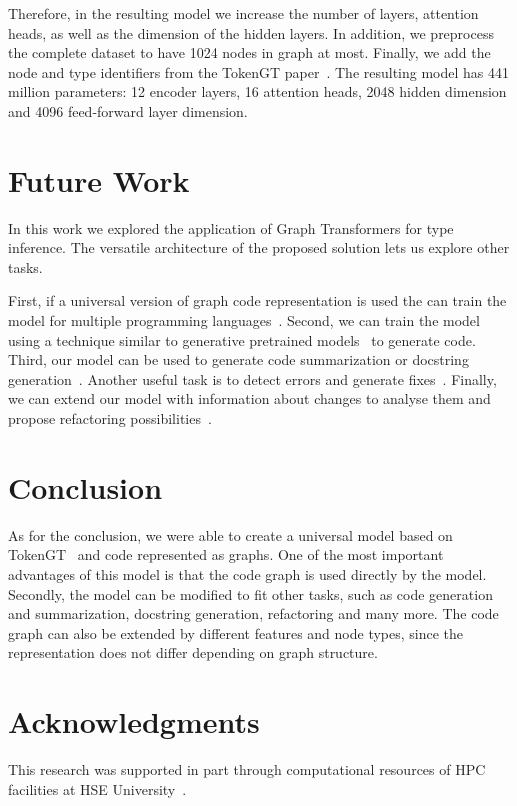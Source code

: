 \documentclass[conference]{IEEEtran}
\begin{document}
Therefore, in the resulting model we increase the number of layers, attention heads, as well as the dimension of the hidden layers.
In addition, we preprocess the complete dataset to have 1024 nodes in graph at most.
Finally, we add the node and type identifiers from the TokenGT paper~\cite{kim_pure_2022}.
The resulting model has 441 million parameters: 12 encoder layers, 16 attention heads, 2048 hidden dimension and 4096 feed-forward layer dimension.

\begin{table*}[t]
    \centering
    \caption{Expirement results of Top-n predictions for different model variants.}
    \label{tab:ablation}
    }
\end{table*}

\section{Future Work}\label{sec:future-work}

In this work we explored the application of Graph Transformers for type inference.
The versatile architecture of the proposed solution lets us explore other tasks.

First, if a universal version of graph code representation is used the can train the model for multiple programming languages~\cite{wang_unified_2022}.
Second, we can train the model using a technique similar to generative pretrained models~\cite{radford_language_2019,brown_language_2020} to generate code.
Third, our model can be used to generate code summarization or docstring generation~\cite{barone_parallel_2017,liu_haconvgnn_2021}.
Another useful task is to detect errors and generate fixes~\cite{bhatia_automated_2016,fujimoto_addressing_2018,marginean_sapfix_2019}.
Finally, we can extend our model with information about changes to analyse them and propose refactoring possibilities~\cite{cabrera_lozoya_commit2vec_2021}.

\section{Conclusion}\label{sec:conclusion}

As for the conclusion, we were able to create a universal model based on TokenGT~\cite{kim_pure_2022} and code represented as graphs.
One of the most important advantages of this model is that the code graph is used directly by the model.
Secondly, the model can be modified to fit other tasks, such as code generation and summarization, docstring generation, refactoring and many more.
The code graph can also be extended by different features and node types, since the representation does not differ depending on graph structure.

\section{Acknowledgments}\label{sec:acknowledgments}

This research was supported in part through computational resources of HPC facilities at HSE University~\cite{kostenetskiy_hpc_2021}.

\printbibliography
\end{document}
